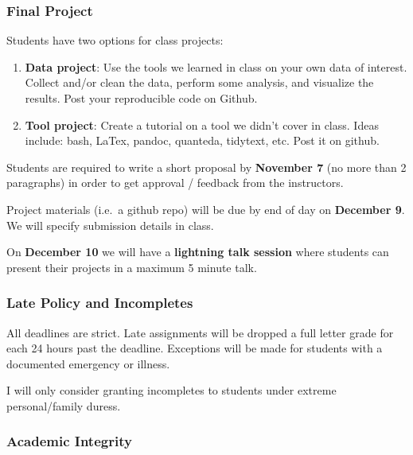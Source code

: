 \documentclass[]{book}
\begin{document}
\hypertarget{final-project}{%
\subsubsection*{Final Project}\label{final-project}}

Students have two options for class projects:

\begin{enumerate}
\def\labelenumi{\arabic{enumi}.}
\item
  \textbf{Data project}: Use the tools we learned in class on your own data of interest. Collect and/or clean the data, perform some analysis, and visualize the results. Post your reproducible code on Github.
\item
  \textbf{Tool project}: Create a tutorial on a tool we didn't cover in class. Ideas include: bash, LaTex, pandoc, quanteda, tidytext, etc. Post it on github.
\end{enumerate}

Students are required to write a short proposal by \textbf{November 7} (no more than 2 paragraphs) in order to get approval / feedback from the instructors.

Project materials (i.e.~a github repo) will be due by end of day on \textbf{December 9}. We will specify submission details in class.

On \textbf{December 10} we will have a \textbf{lightning talk session} where students can present their projects in a maximum 5 minute talk.

\hypertarget{late-policy-and-incompletes}{%
\subsubsection*{Late Policy and Incompletes}\label{late-policy-and-incompletes}}

All deadlines are strict. Late assignments will be dropped a full letter grade for each 24 hours past the deadline. Exceptions will be made for students with a documented emergency or illness.

I will only consider granting incompletes to students under extreme personal/family duress.

\hypertarget{academic-integrity}{%
\subsubsection*{Academic Integrity}\label{academic-integrity}}
\end{document}
